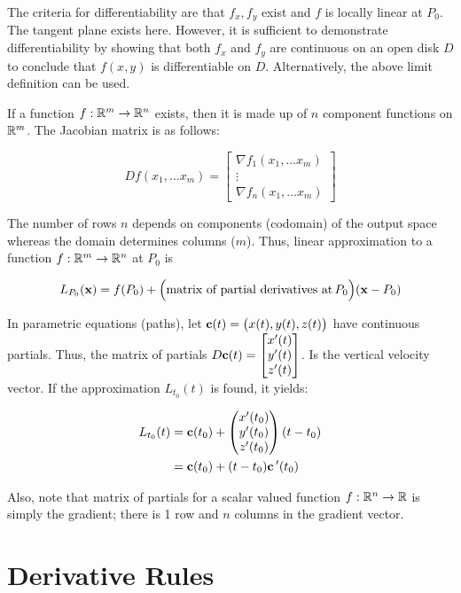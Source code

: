 The criteria for differentiability are that $f_x,f_y$ exist and $f$ is locally linear at $P_0$. The tangent plane exists here. However,
it is sufficient to demonstrate differentiability by showing that both $f_x$ and $f_y$ are continuous on an open disk $D$ to conclude that $f(x,y)$
is differentiable on $D$. Alternatively, the above limit definition can be used.

If a function $f:\mathbb{R}^m\to \mathbb{R}^n$ exists, then it is made up of $n$ component functions on $\mathbb{R}^m$. The Jacobian matrix is as follows:

\[Df\left( x_1,\ldots x_m\right) =\begin{bmatrix} \nabla f_{1}\left(x_1,\ldots x_m\right) \\ \vdots \\ \nabla f_{n}\left(x_1,\ldots x_m\right) \end{bmatrix}\]

The number of rows $n$ depends on components (codomain) of the output space whereas the domain determines columns ($m$). Thus, linear approximation to a function $f:\mathbb{R}^m\to \mathbb{R}^n$ at $P_0$ is

\[L_{P_0}(\textbf{x})=f(P_0)+\Big(\mbox{matrix of partial derivatives at}\,P_0\Big)(\textbf{x}-P_0)\]

In parametric equations (paths), let $\textbf{c}(t)=\big(x(t), y(t), z(t) \big)$ have continuous partials.
Thus, the matrix of partials $D\textbf c(t)=\begin{bmatrix}x'(t)\\y'(t)\\z'(t)\end{bmatrix}$. Is the vertical velocity vector.
If the approximation $L_{t_0}(t)$ is found, it yields:

\begin{align*}
    L_{t_0}(t)&=\textbf c(t_0)+
    \left(
    \begin{matrix}
    x'(t_0)\\
    y'(t_0)\\
    z'(t_0)\\
    \end{matrix}
    \right)
    (t-t_0)\\
    &=\textbf{c} (t_0)+(t-t_0)\textbf c\,'(t_0)
\end{align*}

Also, note that matrix of partials for a scalar valued function $f:\mathbb{R}^n\to \mathbb{R}$ is simply the gradient; there is 1 row and $n$ columns in the gradient vector.

\section{Derivative Rules}

